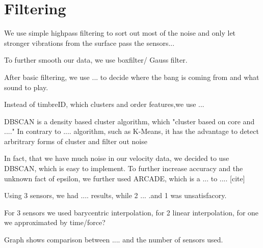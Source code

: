 \section*{Filtering}

We use simple highpass filtering to sort out most of the noise and only let stronger vibrations from the surface pass the sensors... 

To further smooth our data, we use boxfilter/ Gauss filter.

After basic filtering, we use ... to decide where the bang is coming from and what sound to play.

Instead of timbreID, which clusters and order features,we use ... \cite{timbreID}

DBSCAN is a density based cluster algorithm, which "cluster based on core and ...."
In contrary to .... algorithm, such as K-Means, it has the advantage to detect arbritrary forms of cluster and filter out noise\cite{Elbatta2013ADM}

In fact, that we have much noise in our velocity data, we decided to use DBSCAN, which is easy to implement. 
To further increase accuracy and the unknown fact of epsilon, we further used ARCADE, which is a ... to .... [cite]

Using 3 sensors, we had .... results, while 2 ... .and 1 was unsatisfacory.

For 3 sensors we used barycentric interpolation, for 2 linear interpolation, for one we approximated by time/force? 


Graph shows comparison between .... and the number of sensors used.
